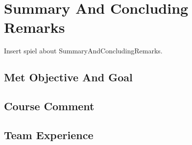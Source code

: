 

\chapter{Summary And Concluding Remarks}
Insert spiel about SummaryAndConcludingRemarks.

\section{Met Objective And Goal}


\section{Course Comment}


\section{Team Experience}

